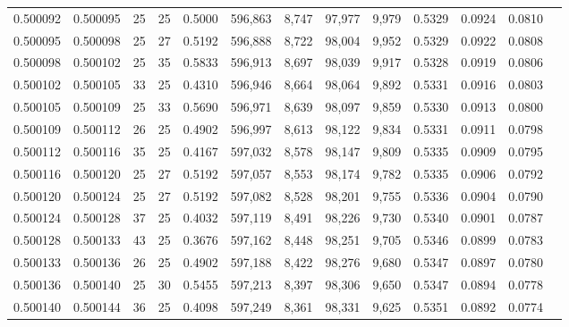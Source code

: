 \begin{tabular}{rrrrrrrrrrrrr}
0.500092 & 0.500095 &    25 &  25 &                                     0.5000 & 596,863 &   8,747 &  97,977 &   9,979 & 0.5329 & 0.0924 & 0.0810 \\
0.500095 & 0.500098 &    25 &  27 &                                     0.5192 & 596,888 &   8,722 &  98,004 &   9,952 & 0.5329 & 0.0922 & 0.0808 \\
0.500098 & 0.500102 &    25 &  35 &                                     0.5833 & 596,913 &   8,697 &  98,039 &   9,917 & 0.5328 & 0.0919 & 0.0806 \\
0.500102 & 0.500105 &    33 &  25 &                                     0.4310 & 596,946 &   8,664 &  98,064 &   9,892 & 0.5331 & 0.0916 & 0.0803 \\
0.500105 & 0.500109 &    25 &  33 &                                     0.5690 & 596,971 &   8,639 &  98,097 &   9,859 & 0.5330 & 0.0913 & 0.0800 \\
0.500109 & 0.500112 &    26 &  25 &                                     0.4902 & 596,997 &   8,613 &  98,122 &   9,834 & 0.5331 & 0.0911 & 0.0798 \\
0.500112 & 0.500116 &    35 &  25 &                                     0.4167 & 597,032 &   8,578 &  98,147 &   9,809 & 0.5335 & 0.0909 & 0.0795 \\
0.500116 & 0.500120 &    25 &  27 &                                     0.5192 & 597,057 &   8,553 &  98,174 &   9,782 & 0.5335 & 0.0906 & 0.0792 \\
0.500120 & 0.500124 &    25 &  27 &                                     0.5192 & 597,082 &   8,528 &  98,201 &   9,755 & 0.5336 & 0.0904 & 0.0790 \\
0.500124 & 0.500128 &    37 &  25 &                                     0.4032 & 597,119 &   8,491 &  98,226 &   9,730 & 0.5340 & 0.0901 & 0.0787 \\
0.500128 & 0.500133 &    43 &  25 &                                     0.3676 & 597,162 &   8,448 &  98,251 &   9,705 & 0.5346 & 0.0899 & 0.0783 \\
0.500133 & 0.500136 &    26 &  25 &                                     0.4902 & 597,188 &   8,422 &  98,276 &   9,680 & 0.5347 & 0.0897 & 0.0780 \\
0.500136 & 0.500140 &    25 &  30 &                                     0.5455 & 597,213 &   8,397 &  98,306 &   9,650 & 0.5347 & 0.0894 & 0.0778 \\
0.500140 & 0.500144 &    36 &  25 &                                     0.4098 & 597,249 &   8,361 &  98,331 &   9,625 & 0.5351 & 0.0892 & 0.0774 \\

\end{tabular}
